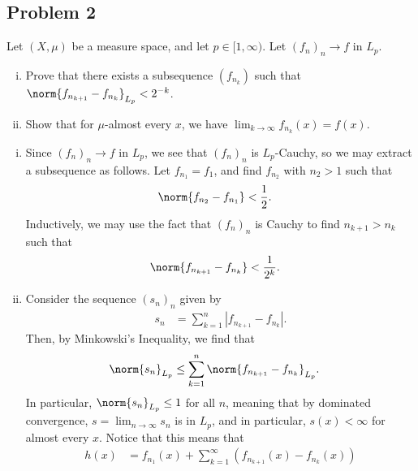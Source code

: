 \documentclass[10pt]{mypackage}
\begin{document}
\subsection{Problem 2}%
\begin{problem}
  Let $\left( X,\mu \right)$ be a measure space, and let $p\in [1,\infty)$. Let $\left( f_n \right)_n\rightarrow f$ in $L_{p}$.
  \begin{enumerate}[(i)]
    \item Prove that there exists a subsequence $\left( f_{n_k} \right)$ such that $\norm{f_{n_{k+1}} - f_{n_{k}}}_{L_p} < 2^{-k}$.
    \item Show that for $\mu$-almost every $x$, we have $\lim_{k\rightarrow\infty} f_{n_{k}}(x) = f(x)$.
  \end{enumerate}
\end{problem}
\begin{enumerate}[(i)]
  \item Since $\left( f_{n} \right)_{n}\rightarrow f$ in $L_{p}$, we see that $\left( f_{n} \right)_{n}$ is $L_{p}$-Cauchy, so we may extract a subsequence as follows. Let $f_{n_{1}} = f_{1}$, and find $f_{n_{2}}$ with $n_2 > 1$ such that
    \begin{align*}
      \norm{f_{n_2} - f_{n_1}} &< \frac{1}{2}.
    \end{align*}
    Inductively, we may use the fact that $\left( f_{n} \right)_n$ is Cauchy to find $n_{k+1} > n_{k}$ such that
    \begin{align*}
      \norm{f_{n_{k+1}} - f_{n_{k}}} &< \frac{1}{2^{k}}.
    \end{align*}
  \item Consider the sequence $\left( s_n \right)_n$ given by
    \begin{align*}
      s_n &= \sum_{k=1}^{n} \left\vert f_{n_{k+1}} - f_{n_{k}} \right\vert.
    \end{align*}
    Then, by Minkowski's Inequality, we find that
    \begin{align*}
      \norm{s_{n}}_{L_p} &\leq \sum_{k=1}^{n}\norm{f_{n_{k+1}} - f_{n_{k}}}_{L_p}.
    \end{align*}
    In particular, $\norm{s_n}_{L_p} \leq 1$ for all $n$, meaning that by dominated convergence, $s = \lim_{n\rightarrow\infty} s_n$ is in $L_p$, and in particular, $s(x) < \infty$ for almost every $x$. Notice that this means that
    \begin{align*}
      h(x) &= f_{n_{1}}(x) + \sum_{k=1}^{\infty} \left( f_{n_{k+1}}(x) - f_{n_{k}}(x) \right)
    \end{align*}

\end{enumerate}
\end{document}

